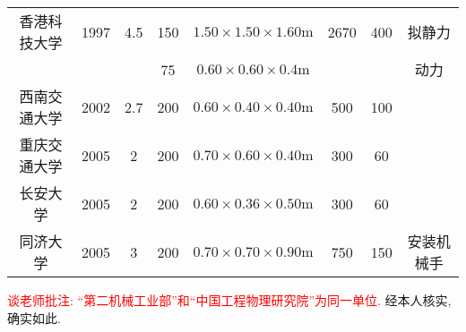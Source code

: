 \begin{landscape}
\begin{solution}
\begin{table}[!htb]
{\begin{tabular}{ c c c c c c c c }
香港科技大学&1997&4.5 & 150&$ 1.50\times1.50\times1.60\mathrm{m}$&2670 & 400 &拟静力 \tabularnewline
           &    &    &  75&$ 0.60\times0.60 \times0.4 \mathrm{m}$& &  & 动力\tabularnewline
西南交通大学&2002&2.7&200&$0.60\times 0.40\times0.40\mathrm{m}$&500&100& \tabularnewline
重庆交通大学&2005& 2 &200&$0.70\times0.60\times0.40\mathrm{m}$&300&60& \tabularnewline
长安大学    &2005& 2 &200&$0.60\times0.36\times0.50\mathrm{m}$&300&60& \tabularnewline
同济大学    &2005& 3 &200&$0.70\times0.70\times0.90\mathrm{m}$&750&150&安装机械手\tabularnewline
\hline 

\end{tabular}}
\end{table}
\textcolor{red}{谈老师批注: ``第二机械工业部''和``中国工程物理研究院''为同一单位.} 经本人核实\cite{caep}, 确实如此.
\end{solution}
\end{landscape}
